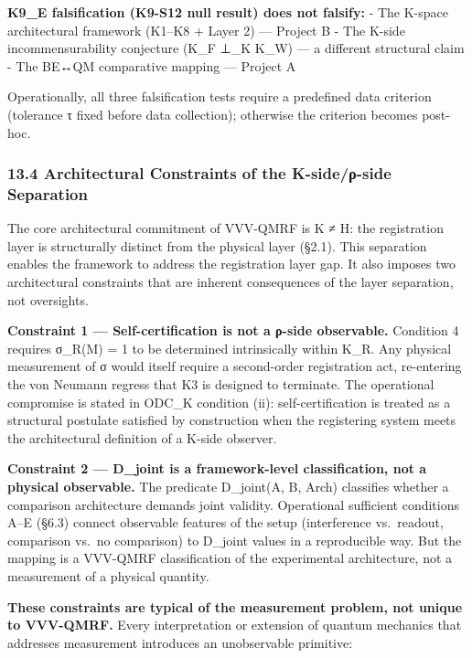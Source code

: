 \documentclass[
  11pt,
]{article}
\begin{document}
\textbf{K9\_E falsification (K9-S12 null result) does not falsify:} -
The K-space architectural framework (K1--K8 + Layer 2) --- Project B -
The K-side incommensurability conjecture (K\_F ⊥\_K K\_W) --- a
different structural claim - The BE↔QM comparative mapping --- Project A

Operationally, all three falsification tests require a predefined data
criterion (tolerance τ fixed before data collection); otherwise the
criterion becomes post-hoc.

\subsubsection{13.4 Architectural Constraints of the K-side/ρ-side
Separation}\label{architectural-constraints-of-the-k-sideux3c1-side-separation}

The core architectural commitment of VVV-QMRF is K ≠ H: the registration
layer is structurally distinct from the physical layer (§2.1). This
separation enables the framework to address the registration layer gap.
It also imposes two architectural constraints that are inherent
consequences of the layer separation, not oversights.

\textbf{Constraint 1 --- Self-certification is not a ρ-side observable.}
Condition 4 requires σ\_R(M) = 1 to be determined intrinsically within
K\_R. Any physical measurement of σ would itself require a second-order
registration act, re-entering the von Neumann regress that K3 is
designed to terminate. The operational compromise is stated in ODC\_K
condition (ii): self-certification is treated as a structural postulate
satisfied by construction when the registering system meets the
architectural definition of a K-side observer.

\textbf{Constraint 2 --- D\_joint is a framework-level classification,
not a physical observable.} The predicate D\_joint(A, B, Arch)
classifies whether a comparison architecture demands joint validity.
Operational sufficient conditions A--E (§6.3) connect observable
features of the setup (interference vs.~readout, comparison vs.~no
comparison) to D\_joint values in a reproducible way. But the mapping is
a VVV-QMRF classification of the experimental architecture, not a
measurement of a physical quantity.

\textbf{These constraints are typical of the measurement problem, not
unique to VVV-QMRF.} Every interpretation or extension of quantum
mechanics that addresses measurement introduces an unobservable
primitive:
\end{document}
